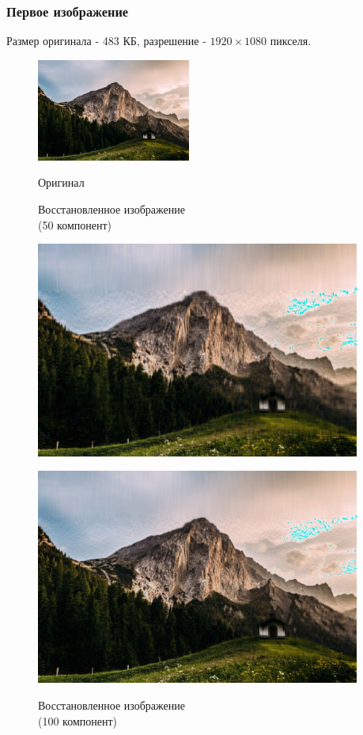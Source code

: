 \documentclass[a4paper]{article}
\begin{document}
\subsubsection{Первое изображение}
Размер оригинала - 483 КБ, разрешение - $1920\times 1080$ пикселя.
\begin{figure}[H]
\centering
\caption{Оригинал}
    \includegraphics[width = 0.45\textwidth]{resources/Austria.jpg}
    \label{fig:aus_orig}
\end{figure}
\begin{figure}[H]
\centering
    \begin{minipage}{.45\textwidth}
    \caption{Восстановленное изображение \\(50 компонент)}
    \includegraphics[width = 0.95\textwidth]{reconstructions/with_50comps_Austria.jpg}
    \label{fig:aus_50}
    \end{minipage}%
    \begin{minipage}{.45\textwidth}
      \centering
    \caption{Восстановленное изображение \\(100 компонент)}
    \includegraphics[width = 0.95\textwidth]{reconstructions/with_100comps_Austria.jpg}
    \label{fig:aus_100}
    \end{minipage}%
\end{figure}
\end{document}
